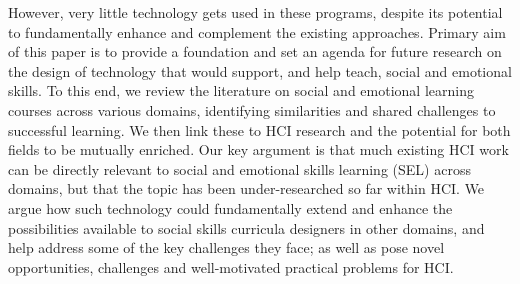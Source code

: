 \documentclass[prodmode,acmtochi]{acmsmall}
\newcommand{\todo}[1]{\textrm{\textrm{\textcolor{LightBlue}{[[#1]]}}}}
\newcommand{\GeraldineFIX}[1]{}
\begin{document}
However, very little technology gets used in these programs, despite its potential to fundamentally enhance and complement the existing approaches.  
%
%
%
Primary aim of this paper is  to provide a foundation and set an agenda
for future research on the design of technology that would support, and help
teach, social and emotional skills. To this end, we review the literature on social and emotional learning courses across various domains, identifying similarities and shared challenges to successful learning. 
We then link these to HCI research %
and the potential for both fields to be mutually enriched. 
Our key argument is that much existing HCI work can be directly relevant to social and emotional skills learning (SEL) across domains, but that the topic has been under-researched so far within HCI. We argue how such technology could fundamentally extend and enhance the possibilities available to social skills curricula designers in other domains, and help address some of the key challenges they face; as well as pose novel opportunities, challenges and well-motivated practical problems for HCI. 



   

\end{document}
